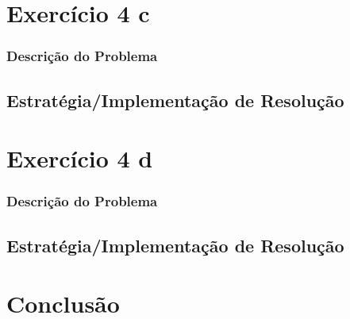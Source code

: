 \documentclass[11pt,a4paper]{report}
\begin{document}
\chapter{Exercício 4 c}

\subsection{Descrição do Problema}


\section{Estratégia/Implementação de Resolução}


\chapter{Exercício 4 d}

\subsection{Descrição do Problema}


\section{Estratégia/Implementação de Resolução}


\chapter{Conclusão}
\end{document}

